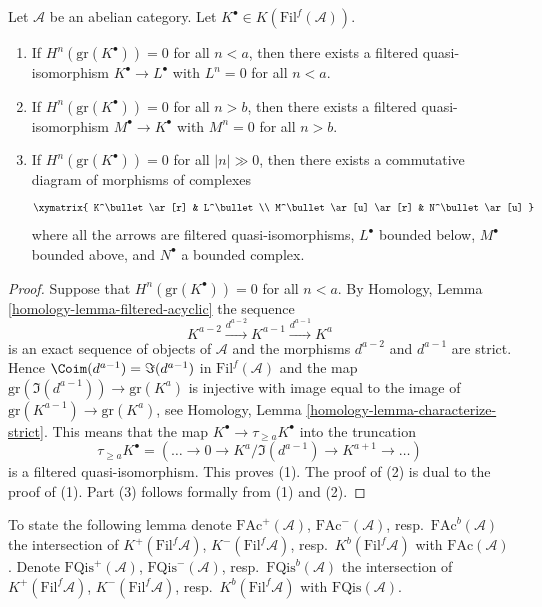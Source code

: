 \begin{lemma}
\label{lemma-filtered-complex-cohomology-bounded}
Let $\mathcal{A}$ be an abelian category.
Let $K^\bullet \in K(\text{Fil}^f(\mathcal{A}))$.
\begin{enumerate}
\item If $H^n(\text{gr}(K^\bullet)) = 0$ for all $n < a$, then there exists
a filtered quasi-isomorphism $K^\bullet \to L^\bullet$ with
$L^n = 0$ for all $n < a$.
\item If $H^n(\text{gr}(K^\bullet)) = 0$ for all $n > b$, then there exists
a filtered quasi-isomorphism $M^\bullet \to K^\bullet$ with
$M^n = 0$ for all $n > b$.
\item If $H^n(\text{gr}(K^\bullet)) = 0$ for all $|n| \gg 0$, then there
exists a commutative diagram of morphisms of complexes
$$
\xymatrix{
K^\bullet \ar[r] & L^\bullet \\
M^\bullet \ar[u] \ar[r] & N^\bullet \ar[u]
}
$$
where all the arrows are filtered quasi-isomorphisms, $L^\bullet$
bounded below, $M^\bullet$ bounded above, and $N^\bullet$ a bounded
complex.
\end{enumerate}
\end{lemma}

\begin{proof}
Suppose that $H^n(\text{gr}(K^\bullet)) = 0$ for all $n < a$. By
Homology, Lemma \ref{homology-lemma-filtered-acyclic}
the sequence
$$
K^{a - 2} \xrightarrow{d^{a - 2}} K^{a - 1} \xrightarrow{d^{a - 1}} K^a
$$
is an exact sequence of objects of $\mathcal{A}$ and the morphisms
$d^{a - 2}$ and $d^{a - 1}$ are strict. Hence
$\Coim(d^{a - 1}) = \Im(d^{a - 1})$ in $\text{Fil}^f(\mathcal{A})$
and the map $\text{gr}(\Im(d^{a - 1})) \to \text{gr}(K^a)$
is injective with image equal to the image of
$\text{gr}(K^{a - 1}) \to \text{gr}(K^a)$, see
Homology, Lemma \ref{homology-lemma-characterize-strict}.
This means that the map $K^\bullet \to \tau_{\geq a}K^\bullet$
into the truncation
$$
\tau_{\geq a}K^\bullet =
(\ldots \to 0 \to K^a/\Im(d^{a - 1}) \to K^{a + 1} \to \ldots)
$$
is a filtered quasi-isomorphism. This proves (1). The proof of (2)
is dual to the proof of (1). Part (3) follows formally from (1) and (2).
\end{proof}

\noindent
To state the following lemma denote
$\text{FAc}^{+}(\mathcal{A})$, $\text{FAc}^{-}(\mathcal{A})$,
resp.\ $\text{FAc}^b(\mathcal{A})$ the intersection of
$K^{+}(\text{Fil}^f\mathcal{A})$, $K^{-}(\text{Fil}^f\mathcal{A})$,
resp.\ $K^b(\text{Fil}^f\mathcal{A})$ with $\text{FAc}(\mathcal{A})$.
Denote $\text{FQis}^{+}(\mathcal{A})$, $\text{FQis}^{-}(\mathcal{A})$,
resp.\ $\text{FQis}^b(\mathcal{A})$ the intersection of
$K^{+}(\text{Fil}^f\mathcal{A})$, $K^{-}(\text{Fil}^f\mathcal{A})$,
resp.\ $K^b(\text{Fil}^f\mathcal{A})$ with $\text{FQis}(\mathcal{A})$.

